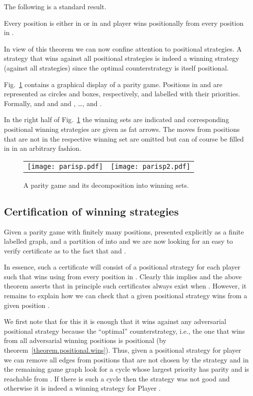 The following is a standard result.
\begin{theorem}\label{theorem.positional.wins}
Every position  is either in  or in  and player  wins
positionally from every position in \@. 
\end{theorem}
In view of this theorem we can now confine attention to positional
strategies. A strategy that wins against all positional strategies is
indeed a winning strategy (against all strategies) since the optimal
counterstrategy is itself positional. 
\begin{example}
  Fig.~\ref{parisp} contains a graphical display of a parity game. 
Positions in  and  are
  represented as circles and boxes, respectively, and labelled with
  their priorities. Formally,  and  and  and , \dots, and . 

  In the right half of Fig.~\ref{parisp} the winning sets are
  indicated and corresponding positional winning strategies are given
  as fat arrows. The moves from positions that are not in the
  respective winning set are omitted but can of course be filled in in
  an arbitrary fashion.
\end{example}
\begin{figure}
\begin{tabular}{cc}
\texttt{[image: parisp.pdf]} \hspace{3em} & \texttt{[image: parisp2.pdf]} 
\end{tabular}
\caption{\label{parisp}
A parity game and its decomposition into winning sets.}
 \end{figure}
\subsection{Certification of winning strategies}




Given a parity game with finitely many positions, presented explicitly as a finite labelled graph, and 
a partition of  into  and  we are now looking for an
easy to verify certificate as to the fact that  and \@.

In essence, such a certificate will consist of a positional strategy
 for each player  such that  wins using 
from every position  in \@. Clearly this implies  and
the above theorem asserts that in principle such certificates always
exist when . However, it remains to explain how we can check
that a given positional strategy  wins from a given position
\@.

We first note that for this it is enough that it wins against any
adversarial positional strategy because the ``optimal''
counterstrategy, i.e., the one that wins from all adversarial winning
positions is positional (by theorem~\ref{theorem.positional.wins})\@. 
Thus, given a positional strategy  for player  we can remove all edges from
positions  that are not chosen by the strategy and in the
remaining game graph look for a cycle whose largest priority has
parity  and is reachable from \@. If there is such a cycle
then the strategy was not good and otherwise it is indeed a winning
strategy for Player \@. 

